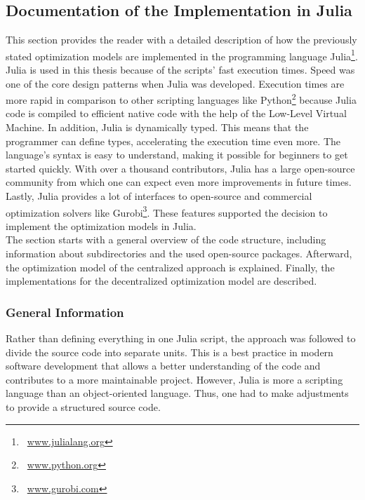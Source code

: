 \subsection{Documentation of the Implementation in Julia}
\label{sec:app:implementation}

This section provides the reader with a detailed description of how the previously stated optimization models are implemented in the programming language Julia\footnote{~\url{www.julialang.org}}. Julia is used in this thesis because of the scripts' fast execution times. Speed was one of the core design patterns when Julia was developed. Execution times are more rapid in comparison to other scripting languages like Python\footnote{~\url{www.python.org}} because Julia code is compiled to efficient native code with the help of the Low-Level Virtual Machine. In addition, Julia is dynamically typed. This means that the programmer can define types, accelerating the execution time even more. The language's syntax is easy to understand, making it possible for beginners to get started quickly. With over a thousand contributors, Julia has a large open-source community from which one can expect even more improvements in future times. Lastly, Julia provides a lot of interfaces to open-source and commercial optimization solvers like Gurobi\footnote{~\url{www.gurobi.com}}. These features supported the decision to implement the optimization models in Julia. \\

The section starts with a general overview of the code structure, including information about subdirectories and the used open-source packages. Afterward, the optimization model of the centralized approach is explained. Finally, the implementations for the decentralized optimization model are described.

\subsubsection{General Information}

Rather than defining everything in one Julia script, the approach was followed to divide the source code into separate units. This is a best practice in modern software development that allows a better understanding of the code and contributes to a more maintainable project. However, Julia is more a scripting language than an object-oriented language. Thus, one had to make adjustments to provide a structured source code.\\ 

